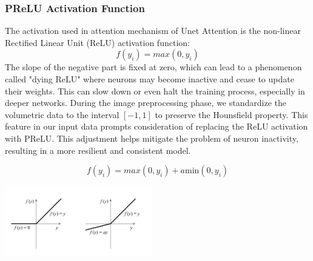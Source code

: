\documentclass{article}
\begin{document}
\begin{multicols}{2}
\subsubsection{PReLU Activation Function}
The activation used in attention mechanism of Unet Attention is the non-linear Rectified Linear Unit (ReLU) activation function:
$$ f(y_i) = max(0, y_i) $$
The slope of the negative part is fixed at zero, which can lead to a phenomenon called "dying ReLU" where neurons may become inactive and cease to update their weights. This can slow down or even halt the training process, especially in deeper networks. During the image preprocessing phase, we standardize the volumetric data to the interval $[-1,1]$ to preserve the Hounsfield property. This feature in our input data prompts consideration of replacing the ReLU activation with PReLU. This adjustment helps mitigate the problem of neuron inactivity, resulting in a more resilient and consistent model.

$$ f(y_i) = max(0, y_i) + a \text{min}(0, y_i) $$ 

\includegraphics[width=0.48\textwidth]{figures/PReLU.png}



\begin{figure}
\centering
\begin{subfigure}{0.15\textwidth} %
\end{subfigure}
\end{figure}
\end{multicols}
\end{document}
